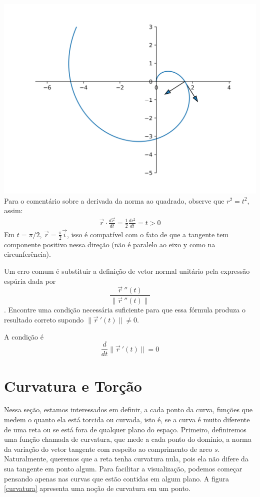 \begin{resp}
\includegraphics[scale=.8]{./cap_curvas/figs//espiral_lista_a1} 
Para o comentário sobre a derivada da norma ao quadrado, observe que $r^2=t^2$, assim:
\begin{eqnarray*}
\vec{r}\cdot\frac{d\vec{r}}{dt}=\frac{1}{2}\frac{d r^2}{dt}=t>0
\end{eqnarray*}
Em $t=\pi/2$, $\vec{r} = \frac{\pi}{2}\vec{i}$, isso é compatível com o fato de que a tangente tem componente positivo nessa direção (não é paralelo ao eixo y como na circunferência).
\end{resp}


\begin{exer}Um erro comum é substituir a definição de vetor normal unitário pela expressão espúria dada por $$\frac{\vec{r}\!~''(t)}{\|\vec{r}\!~''(t)\|}$$. Encontre uma condição necessária suficiente para que essa fórmula produza o resultado correto supondo $\|\vec{r}\!~'(t)\|\neq 0$.

\end{exer}
\begin{resp}
  A condição é $$\frac{d}{dt}\|\vec{r}\!~'(t)\|=0$$
\end{resp}

\section{Curvatura e Torção}

Nessa seção, estamos interessados em definir, a cada ponto da curva, funções que medem o quanto ela está torcida ou curvada, isto é, se a curva é muito diferente de uma reta ou se está fora de qualquer plano do espaço. Primeiro, definiremos uma função chamada de curvatura, que mede a cada ponto do domínio, a norma da variação do vetor tangente com respeito ao comprimento de arco $s$. Naturalmente, queremos que a reta tenha curvatura nula, pois ela não difere da sua tangente em ponto algum. Para facilitar a visualização, podemos começar pensando apenas nas curvas que estão contidas em algum plano. A figura \ref{curvatura} apresenta uma noção de curvatura em um ponto.


